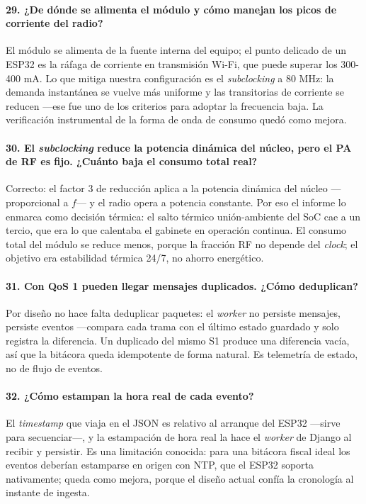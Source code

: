 \documentclass[11pt, a4paper]{article}
\begin{document}
\paragraph{29. ¿De dónde se alimenta el módulo y cómo manejan los picos de corriente del radio?}
El módulo se alimenta de la fuente interna del equipo; el punto delicado de un ESP32 es la ráfaga de corriente en transmisión Wi-Fi, que puede superar los 300-400 mA. Lo que mitiga nuestra configuración es el \textit{subclocking} a 80 MHz: la demanda instantánea se vuelve más uniforme y las transitorias de corriente se reducen —ese fue uno de los criterios para adoptar la frecuencia baja. La verificación instrumental de la forma de onda de consumo quedó como mejora.

\paragraph{30. El \textit{subclocking} reduce la potencia dinámica del núcleo, pero el PA de RF es fijo. ¿Cuánto baja el consumo total real?}
Correcto: el factor 3 de reducción aplica a la potencia dinámica del núcleo —proporcional a $f$— y el radio opera a potencia constante. Por eso el informe lo enmarca como decisión térmica: el salto térmico unión-ambiente del SoC cae a un tercio, que era lo que calentaba el gabinete en operación continua. El consumo total del módulo se reduce menos, porque la fracción RF no depende del \textit{clock}; el objetivo era estabilidad térmica 24/7, no ahorro energético.

\paragraph{31. Con QoS 1 pueden llegar mensajes duplicados. ¿Cómo deduplican?}
Por diseño no hace falta deduplicar paquetes: el \textit{worker} no persiste mensajes, persiste eventos —compara cada trama con el último estado guardado y solo registra la diferencia. Un duplicado del mismo S1 produce una diferencia vacía, así que la bitácora queda idempotente de forma natural. Es telemetría de estado, no de flujo de eventos.

\paragraph{32. ¿Cómo estampan la hora real de cada evento?}
El \textit{timestamp} que viaja en el JSON es relativo al arranque del ESP32 —sirve para secuenciar—, y la estampación de hora real la hace el \textit{worker} de Django al recibir y persistir. Es una limitación conocida: para una bitácora fiscal ideal los eventos deberían estamparse en origen con NTP, que el ESP32 soporta nativamente; queda como mejora, porque el diseño actual confía la cronología al instante de ingesta.
\end{document}
